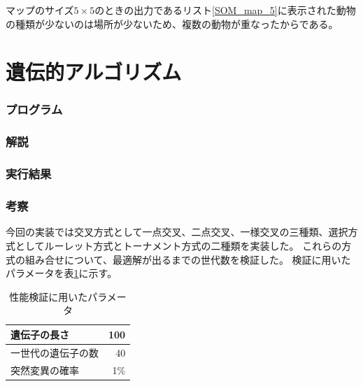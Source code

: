\documentclass{jsarticle}
\begin{document}




マップのサイズ$5\times5$のときの出力であるリスト\ref{SOM_map_5}に表示された動物の種類が少ないのは場所が少ないため、複数の動物が重なったからである。


\part{遺伝的アルゴリズム}
\section{プログラム}


\section{解説}


\section{実行結果}


\section{考察}
今回の実装では交叉方式として一点交叉、二点交叉、一様交叉の三種類、選択方式としてルーレット方式とトーナメント方式の二種類を実装した。
これらの方式の組み合せについて、最適解が出るまでの世代数を検証した。
検証に用いたパラメータを表\ref{GA_params}に示す。

\begin{table}[H]
	\caption{性能検証に用いたパラメータ\label{GA_params}}
	\begin{center}
		\begin{tabular}{|l|r|} \hline
			遺伝子の長さ & 100 \\ \hline
			一世代の遺伝子の数 & 40 \\ \hline
			突然変異の確率 & 1\% \\ \hline
		\end{tabular}
	\end{center}
\end{table}
\end{document}
